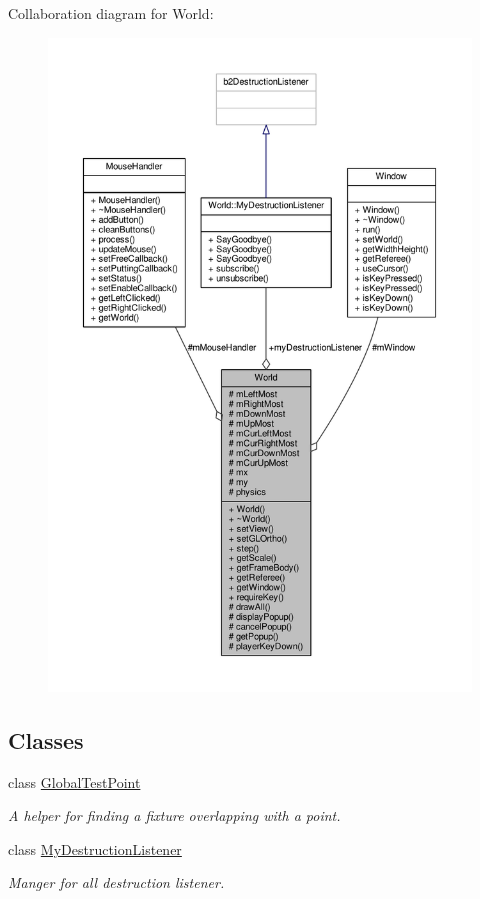 Collaboration diagram for World\+:\nopagebreak
\begin{figure}[H]
\begin{center}
\leavevmode
\includegraphics[width=350pt]{classWorld__coll__graph}
\end{center}
\end{figure}
\subsection*{Classes}
\begin{DoxyCompactItemize}
\item 
class \hyperlink{classWorld_1_1GlobalTestPoint}{Global\+Test\+Point}
\begin{DoxyCompactList}\small\item\em A helper for finding a fixture overlapping with a point. \end{DoxyCompactList}\item 
class \hyperlink{classWorld_1_1MyDestructionListener}{My\+Destruction\+Listener}
\begin{DoxyCompactList}\small\item\em Manger for all destruction listener. \end{DoxyCompactList}\end{DoxyCompactItemize}
